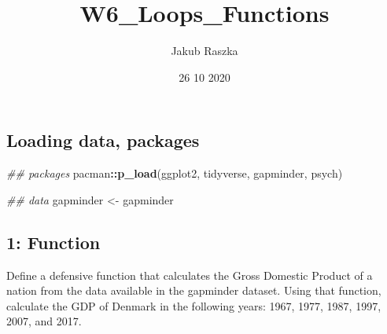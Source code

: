 \documentclass[
]{article}
\title{W6\_Loops\_Functions}
\author{Jakub Raszka}
\date{26 10 2020}
\newenvironment{Shaded}{\begin{snugshade}}{\end{snugshade}}
\newcommand{\CommentTok}[1]{\textcolor[rgb]{0.56,0.35,0.01}{\textit{#1}}}
\newcommand{\KeywordTok}[1]{\textcolor[rgb]{0.13,0.29,0.53}{\textbf{#1}}}
\newcommand{\NormalTok}[1]{#1}
\newcommand{\OperatorTok}[1]{\textcolor[rgb]{0.81,0.36,0.00}{\textbf{#1}}}
\newcommand{\StringTok}[1]{\textcolor[rgb]{0.31,0.60,0.02}{#1}}
\begin{document}
\maketitle

\hypertarget{loading-data-packages}{%
\subsection{Loading data, packages}\label{loading-data-packages}}

\begin{Shaded}
\begin{Highlighting}[]
\CommentTok{## packages}
\NormalTok{pacman}\OperatorTok{::}\KeywordTok{p_load}\NormalTok{(ggplot2, tidyverse, gapminder, psych)}

\CommentTok{## data}
\NormalTok{gapminder <-}\StringTok{ }\NormalTok{gapminder}
\end{Highlighting}
\end{Shaded}

\hypertarget{function}{%
\subsection{1: Function}\label{function}}

Define a defensive function that calculates the Gross Domestic Product
of a nation from the data available in the gapminder dataset. Using that
function, calculate the GDP of Denmark in the following years: 1967,
1977, 1987, 1997, 2007, and 2017.
\end{document}
